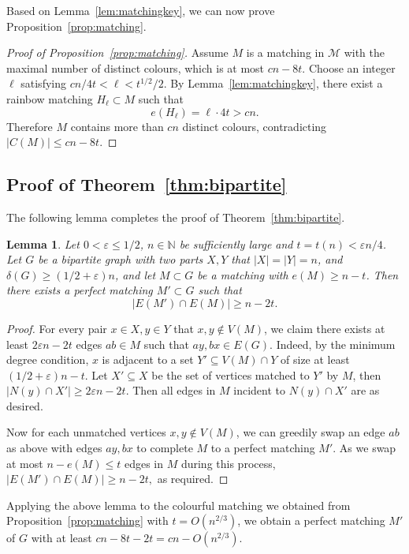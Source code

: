\documentclass[11pt,reqno]{amsart}
\newtheorem{lemma}[theorem]{Lemma}
\theoremstyle{definition}
\theoremstyle{remark}
\newcommand\cM{\mathcal{M}}
\renewcommand\leq{\leqslant}
\renewcommand\geq{\geqslant}
\renewcommand\le{\leqslant}
\renewcommand\ge{\geqslant}
\begin{document}
Based on Lemma~\ref{lem:matchingkey}, we can now prove Proposition~\ref{prop:matching}.

\begin{proof}[Proof of Proposition~\ref{prop:matching}]
Assume $M$ is a matching in $\cM$ with the maximal number of distinct colours, which is at most $cn-8t$. Choose an integer $\ell$ satisfying $cn/4t<\ell<t^{1/2}/2$. By Lemma~\ref{lem:matchingkey}, there exist a rainbow matching $H_\ell\subset M$ such that 
\[
e(H_\ell)=\ell\cdot 4t>cn.
\]
Therefore $M$ contains more than $cn$ distinct colours, contradicting $|C(M)|\le cn-8t$.
\end{proof}




\subsection{Proof of Theorem~\ref{thm:bipartite}}
The following lemma completes the proof of Theorem~\ref{thm:bipartite}.
\begin{lemma}
Let $0<\varepsilon\leq1/2$, $n\in\mathbb{N}$ be sufficiently large and $t=t(n)<\varepsilon n/4$. Let $G$ be a bipartite graph with two parts $X,Y$ that $|X|=|Y|=n$, and $\delta(G)\ge (1/2+\varepsilon)n$, and let $M\subset G$ be a matching with $e(M)\geq n-t$. Then there exists a perfect matching $M'\subset G$ such that 
$$|E(M')\cap E(M)|\geq n-2t.$$
\end{lemma}

\begin{proof}
For every pair $x\in X, y\in Y$ that $x,y\notin V(M)$, we claim there exists at least $2\varepsilon n-2t$ edges $ab\in M$ such that $ay,bx\in E(G)$.
Indeed, by the minimum degree condition, $x$ is adjacent to a set $Y'\subseteq V(M)\cap Y$ of size at least $(1/2+\varepsilon)n-t$. Let $X'\subseteq X$ be the set of vertices matched to $Y'$ by $M$, then $|N(y)\cap X'|\geq 2\varepsilon n-2t.$ Then all edges in $M$ incident to $N(y)\cap X'$ are as desired. 

Now for each unmatched vertices $x,y\not\in V(M)$, we can greedily swap an edge $ab$ as above with edges $ay,bx$ to complete $M$ to a perfect matching $M'$. As we swap at most $n-e(M)\le t$ edges in $M$ during this process, $|E(M')\cap E(M)|\geq n-2t,$
as required.
\end{proof}

Applying the above lemma to the colourful matching we obtained from Proposition~\ref{prop:matching} with $t=O(n^{2/3})$, we obtain a perfect matching $M'$ of $G$ with at least $cn-8t-2t=cn-O(n^{2/3})$.
\end{document}
